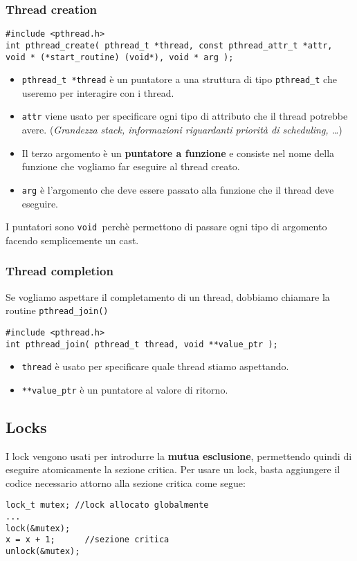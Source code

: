 \documentclass[12pt, twoside, letterpaper]{article}
\begin{document}
			\subsubsection{Thread creation}
				\begin{lstlisting}[style=CStyle]
#include <pthread.h>
int pthread_create( pthread_t *thread, const pthread_attr_t *attr, void * (*start_routine) (void*), void * arg ); \end{lstlisting}
				
				\begin{itemize}
					\item \texttt{pthread\_t *thread} è un puntatore a una struttura di tipo \texttt{pthread\_t} che useremo per interagire con i thread.
					\item \texttt{attr} viene usato per specificare ogni tipo di attributo che il thread potrebbe avere. (\textit{Grandezza stack, informazioni riguardanti priorità di scheduling, \dots})
					\item Il terzo argomento è un \textbf{puntatore a funzione} e consiste nel nome della funzione che vogliamo far eseguire al thread creato.
					\item \texttt{arg} è l’argomento che deve essere passato alla funzione che il thread deve eseguire.
				\end{itemize}
				
				I puntatori sono \texttt{void }perchè permettono di passare ogni tipo di argomento facendo semplicemente un cast.
		
			\subsubsection{Thread completion}
				Se vogliamo aspettare il completamento di un thread, dobbiamo chiamare la routine \texttt{pthread\_join()}
				\begin{lstlisting}[style=CStyle]
#include <pthread.h>
int pthread_join( pthread_t thread, void **value_ptr ); \end{lstlisting}
				\begin{itemize}
					\item \texttt{thread} è usato per specificare quale thread stiamo aspettando.
					\item \texttt{**value\_ptr} è un puntatore al valore di ritorno.
				\end{itemize}

				
		\subsection{Locks}
			I lock vengono usati per introdurre la \textbf{mutua esclusione}, permettendo quindi di eseguire atomicamente la sezione critica. Per usare un lock, basta aggiungere il codice necessario attorno alla sezione critica come segue:
			\begin{lstlisting}[style=CStyle]
lock_t mutex; //lock allocato globalmente
...
lock(&mutex);
x = x + 1; 		//sezione critica
unlock(&mutex); \end{lstlisting}				
			
\end{document}
